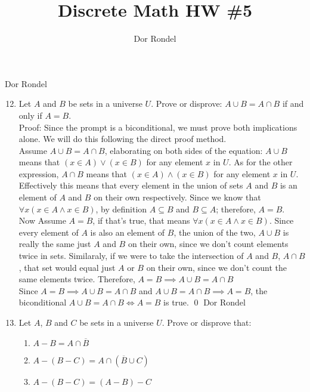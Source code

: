 \documentclass{article}
\title{Discrete Math HW \#5}
\author{Dor Rondel}
\begin{document}
\maketitle
\newpage
Dor Rondel \\
\begin{enumerate}
  \setcounter{enumi}{11}
  \item Let $A$ and $B$ be sets in a universe $U$.
Prove or disprove: $A \cup B = A\cap B$ if and only if $A=B$.
   \newline \\
   Proof: Since the prompt is a biconditional, we must prove both implications alone. We will do this following the direct proof method. \\
   \newline
   Assume $A \cup B = A\cap B$, elaborating on both sides of the equation:      $A \cup B$ means that $(x \in A) \lor (x \in B)$ for any element $x$ in $U$. As for the other expression, $A\cap B$ means that $(x \in A) \land (x \in B)$ for any element $x$ in $U$. Effectively this means that every element in the union of sets $A$ and $B$ is an element of $A$ and $B$ on their own respectively. Since we know that $\forall x(x \in A
 \land x \in B)$, by definition $A \subseteq B$ and $B \subseteq A$; therefore, $A=B$.
 \newline \\
 Now Assume $A=B$, if that's true, that means $\forall x(x \in A
 \land x \in B)$. Since every element of $A$ is also an element of $B$, the union of the two, $A \cup B$ is really the same just $A$ and $B$ on their own, since we don't count elements twice in sets. Similaraly, if we were to take the intersection of $A$ and $B$, $A \cap B$, that set would equal just $A$ or $B$ on their own, since we don't count the same elements twice. Therefore, $A=B \implies A \cup B = A\cap B$ \\
 \newline
 Since $A=B \implies A \cup B = A\cap B$ and $A \cup B = A\cap B \implies A=B$, the biconditional $A \cup B = A\cap B \iff A=B$ is true. \qed
 \newpage
Dor Rondel \\
      \item Let $A$, $B$ and $C$ be sets in a universe $U$. Prove or disprove that:
    \begin{enumerate}
        \item $A-B=A\cap \overline{B}$
        \item $A-(B-C)=A\cap (\overline{B} \cup C)$
        \item $A-(B-C)=(A-B)-C$

\end{enumerate}
\end{enumerate}
\end{document}
